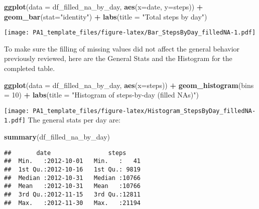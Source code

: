 \documentclass[
]{article}
\newenvironment{Shaded}{\begin{snugshade}}{\end{snugshade}}
\newcommand{\AttributeTok}[1]{\textcolor[rgb]{0.13,0.29,0.53}{#1}}
\newcommand{\DecValTok}[1]{\textcolor[rgb]{0.00,0.00,0.81}{#1}}
\newcommand{\FunctionTok}[1]{\textcolor[rgb]{0.13,0.29,0.53}{\textbf{#1}}}
\newcommand{\NormalTok}[1]{#1}
\newcommand{\SpecialCharTok}[1]{\textcolor[rgb]{0.81,0.36,0.00}{\textbf{#1}}}
\newcommand{\StringTok}[1]{\textcolor[rgb]{0.31,0.60,0.02}{#1}}
\begin{document}
\begin{Shaded}
\begin{Highlighting}[]
\FunctionTok{ggplot}\NormalTok{(}\AttributeTok{data =}\NormalTok{ df\_filled\_na\_by\_day, }\FunctionTok{aes}\NormalTok{(}\AttributeTok{x=}\NormalTok{date, }\AttributeTok{y=}\NormalTok{steps)) }\SpecialCharTok{+}
  \FunctionTok{geom\_bar}\NormalTok{(}\AttributeTok{stat=}\StringTok{"identity"}\NormalTok{) }\SpecialCharTok{+}
  \FunctionTok{labs}\NormalTok{(}\AttributeTok{title =} \StringTok{"Total steps by day"}\NormalTok{)}
\end{Highlighting}
\end{Shaded}

\texttt{[image: PA1\_template\_files/figure-latex/Bar\_StepsByDay\_filledNA-1.pdf]}

To make sure the filling of missing values did not affect the general
behavior previously reviewed, here are the General Stats and the
Histogram for the completed table.

\begin{Shaded}
\begin{Highlighting}[]
\FunctionTok{ggplot}\NormalTok{(}\AttributeTok{data =}\NormalTok{ df\_filled\_na\_by\_day, }\FunctionTok{aes}\NormalTok{(}\AttributeTok{x=}\NormalTok{steps)) }\SpecialCharTok{+}
  \FunctionTok{geom\_histogram}\NormalTok{(}\AttributeTok{bins =} \DecValTok{10}\NormalTok{) }\SpecialCharTok{+}
  \FunctionTok{labs}\NormalTok{(}\AttributeTok{title =} \StringTok{"Histogram of steps{-}by{-}day (filled NAs)"}\NormalTok{)}
\end{Highlighting}
\end{Shaded}

\texttt{[image: PA1\_template\_files/figure-latex/Histogram\_StepsByDay\_filledNA-1.pdf]}
The general stats per day are:

\begin{Shaded}
\begin{Highlighting}[]
\FunctionTok{summary}\NormalTok{(df\_filled\_na\_by\_day)}
\end{Highlighting}
\end{Shaded}

\begin{verbatim}
##       date                steps      
##  Min.   :2012-10-01   Min.   :   41  
##  1st Qu.:2012-10-16   1st Qu.: 9819  
##  Median :2012-10-31   Median :10766  
##  Mean   :2012-10-31   Mean   :10766  
##  3rd Qu.:2012-11-15   3rd Qu.:12811  
##  Max.   :2012-11-30   Max.   :21194
\end{verbatim}
\end{document}
